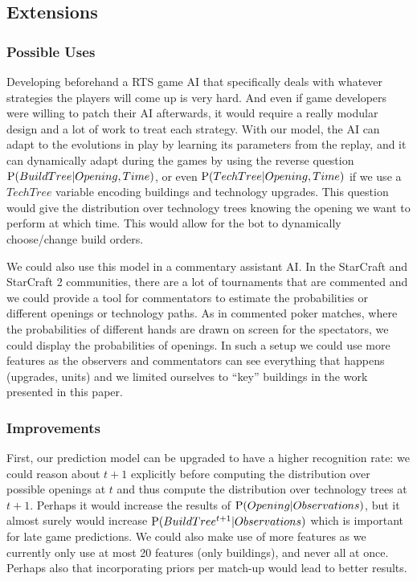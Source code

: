 \subsection{Extensions}

\subsubsection{Possible Uses}
Developing beforehand a RTS game AI that specifically deals with whatever strategies the players will come up is very hard. And even if game developers were willing to patch their AI afterwards, it would require a really modular design and a lot of work to treat each strategy. With our model, the AI can adapt to the evolutions in play by learning its parameters from the replay, and it can dynamically adapt during the games by using the reverse question $\mathrm{P}(BuildTree | Opening,Time)$, or even $\mathrm{P}(TechTree | Opening, Time)$ if we use a $TechTree$ variable encoding buildings and technology upgrades. This question would give the distribution over technology trees knowing the opening we want to perform at which time. This would allow for the bot to dynamically choose/change build orders.

We could also use this model in a commentary assistant AI. In the StarCraft and StarCraft 2 communities, there are a lot of  tournaments that are commented and we could provide a tool for commentators to estimate the probabilities or different openings or technology paths. As in commented poker matches, where the probabilities of different hands are drawn on screen for the spectators, we could display the probabilities of openings. In such a setup we could use more features as the observers and commentators can see everything that happens (upgrades, units) and we limited ourselves to ``key'' buildings in the work presented in this paper.

\subsubsection{Improvements}

First, our prediction model can be upgraded to have a higher recognition rate: we could reason about $t+1$ explicitly before computing the distribution over possible openings at $t$ and thus compute the distribution over technology trees at $t+1$. Perhaps it would increase the results of $\mathrm{P}(Opening|Observations)$, but it almost surely would increase $\mathrm{P}(BuildTree^{t+1}|Observations)$ which is important for late game predictions. We could also make use of more features as we currently only use at most 20 features (only buildings), and never all at once. Perhaps also that incorporating priors per match-up would lead to better results.

